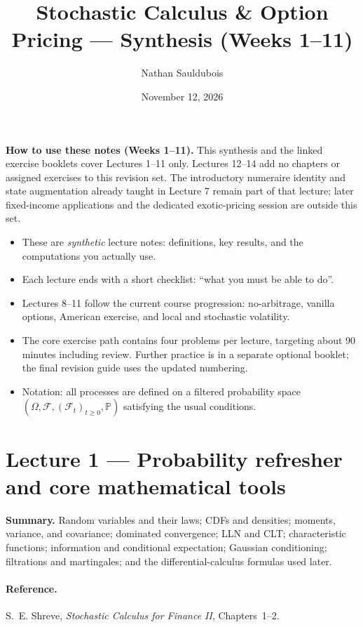 \documentclass[11pt]{article}
\title{Stochastic Calculus \& Option Pricing --- Synthesis (Weeks 1--11)}
\author{Nathan Sauldubois}
\date{November 12, 2026}
\newcommand{\F}{\mathcal{F}}
\newcommand{\Pbb}{\mathbb{P}}
\newcommand{\1}{\mathbf{1}}
\theoremstyle{plain}
\theoremstyle{definition}
\theoremstyle{remark}
\newcommand{\lecturesummary}[1]{%
\begin{center}
\begin{minipage}{0.95\linewidth}
\small\textbf{Summary.} #1
\end{minipage}
\end{center}
\vspace{0.5em}
}
\begin{document}
\maketitle
\vspace{-0.8em}

\noindent\textbf{How to use these notes (Weeks 1--11).}
This synthesis and the linked exercise booklets cover Lectures 1--11 only.
Lectures 12--14 add no chapters or assigned exercises to this revision set.
The introductory numeraire identity and state augmentation already taught
in Lecture 7 remain part of that lecture; later fixed-income applications
and the dedicated exotic-pricing session are outside this set.
\begin{itemize}[leftmargin=1.4em, itemsep=0.2em]
  \item These are \emph{synthetic} lecture notes: definitions, key results, and the computations you actually use.
  \item Each lecture ends with a short checklist: ``what you must be able to do''.
  \item Lectures 8--11 follow the current course progression: no-arbitrage, vanilla options, American exercise, and local and stochastic volatility.
  \item The core exercise path contains four problems per lecture, targeting about 90 minutes including review. Further practice is in a separate optional booklet; the final revision guide uses the updated numbering.
  \item Notation: all processes are defined on a filtered probability space $(\Omega,\F,(\F_t)_{t\ge 0},\Pbb)$ satisfying the usual conditions.
\end{itemize}

\tableofcontents
\bigskip


\section{Lecture 1 --- Probability refresher and core mathematical tools}

\lecturesummary{Random variables and their laws; CDFs and densities; moments,
variance, and covariance; dominated convergence; LLN and CLT; characteristic
functions; information and conditional expectation; Gaussian conditioning;
filtrations and martingales; and the differential-calculus formulas used later.}

\paragraph{Reference.}
S.~E. Shreve, \textit{Stochastic Calculus for Finance II}, Chapters~1--2.
\end{document}
